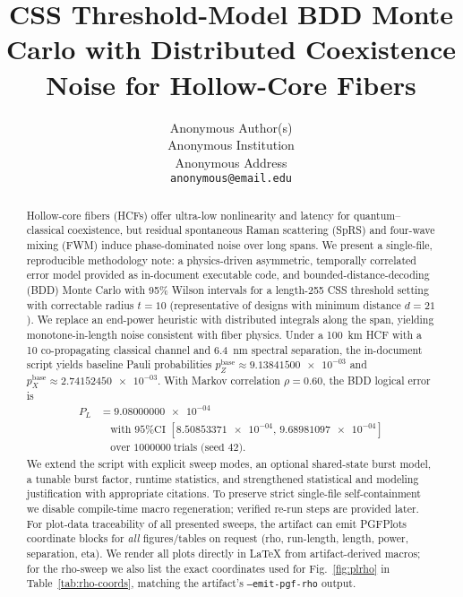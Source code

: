 \documentclass{article}
\newcommand{\nexact}[1]{#1}
\newcommand{\val}[1]{\num[round-mode=figures,round-precision=3]{#1}}
\newcommand{\simL}{100}
\newcommand{\simpcl}{10}
\newcommand{\simsep}{6.4}
\newcommand{\simn}{255}
\newcommand{\simtrials}{1000000}
\newcommand{\simseed}{42}
\newcommand{\simpz}{9.13841500e-03}
\newcommand{\simpx}{2.74152450e-03}
\newcommand{\simrhoB}{0.60}
\newcommand{\simpLB}{9.08000000e-04}
\newcommand{\simpLBlo}{8.50853371e-04}
\newcommand{\simpLBhi}{9.68981097e-04}
\begin{document}
\title{CSS Threshold-Model BDD Monte Carlo with Distributed Coexistence Noise for Hollow-Core Fibers}

\author{%
  Anonymous Author(s) \\
  Anonymous Institution \\
  Anonymous Address \\
  \texttt{anonymous@email.edu} \\
}
\maketitle


\begin{abstract}
\begin{sloppypar}
Hollow-core fibers (HCFs) offer ultra-low nonlinearity and latency for quantum--classical coexistence, but residual spontaneous Raman scattering (SpRS) and four-wave mixing (FWM) induce phase-dominated noise over long spans. We present a single-file, reproducible methodology note: a physics-driven asymmetric, temporally correlated error model provided as in-document executable code, and bounded-distance-decoding (BDD) Monte Carlo with 95\% Wilson intervals for a length-\nexact{\simn} CSS threshold setting with correctable radius $t=10$ (representative of designs with minimum distance $d=21$). We replace an end-power heuristic with distributed integrals along the span, yielding monotone-in-length noise consistent with fiber physics. Under a \SI{\simL}{\kilo\meter} HCF with a \SI{\simpcl}{\dBm} co-propagating classical channel and \SI{\simsep}{\nano\meter} spectral separation, the in-document script yields baseline Pauli probabilities $p_Z^{\text{base}}\approx \allowbreak \val{\simpz}$ and $p_X^{\text{base}}\approx \allowbreak \val{\simpx}$. With Markov correlation $\rho=\nexact{\simrhoB}$, the BDD logical error is
\begin{align*}
P_L &= \val{\simpLB} \\
&\quad \text{with 95\% CI }[\val{\simpLBlo},\,\val{\simpLBhi}] \\
&\quad \text{over } \nexact{\simtrials}\ \text{trials (seed \nexact{\simseed})}.
\end{align*}
We extend the script with explicit sweep modes, an optional shared-state burst model, a tunable burst factor, runtime statistics, and strengthened statistical and modeling justification with appropriate citations. To preserve strict single-file self-containment we disable compile-time macro regeneration; verified re-run steps are provided later. For plot-data traceability of all presented sweeps, the artifact can emit PGFPlots coordinate blocks for \emph{all} figures/tables on request (rho, run-length, length, power, separation, eta). We render all plots directly in LaTeX from artifact-derived macros; for the rho-sweep we also list the exact coordinates used for Fig.~\ref{fig:plrho} in Table~\ref{tab:rho-coords}, matching the artifact's \texttt{--emit-pgf-rho} output.
\end{sloppypar}
\end{abstract}
\end{document}
